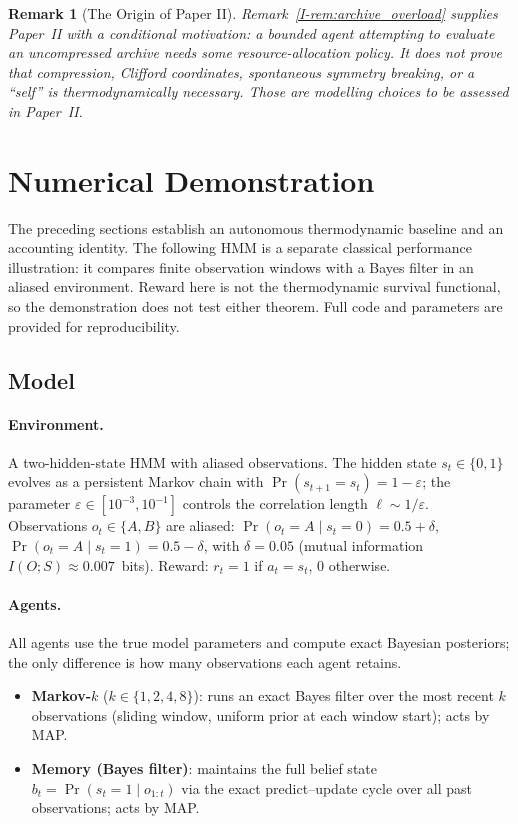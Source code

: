 \documentclass[12pt,a4paper,openany]{book}
\newtheorem{remark}[theorem]{Remark}
\begin{document}
\begin{remark}[The Origin of Paper II]
\label{I-rem:paper_II}
Remark~\ref{I-rem:archive_overload} supplies Paper~II with a conditional
motivation: a bounded agent attempting to evaluate an uncompressed
archive needs some resource-allocation policy.  It does not prove that
compression, Clifford coordinates, spontaneous symmetry breaking, or a
``self'' is thermodynamically necessary.  Those are modelling choices
to be assessed in Paper~II.
\end{remark}

\section{Numerical Demonstration}
\label{I-sec:numerical}

The preceding sections establish an autonomous thermodynamic baseline
and an accounting identity.  The following HMM is a separate classical
performance illustration: it compares finite observation windows with
a Bayes filter in an aliased environment.  Reward here is not the
thermodynamic survival functional, so the demonstration does not test
either theorem.
Full code and parameters are provided for reproducibility.

\subsection{Model}
\label{I-subsec:demo_model}

\paragraph{Environment.}
A two-hidden-state HMM with aliased observations.
The hidden state $s_t \in \{0,1\}$ evolves as a persistent
Markov chain with $\Pr(s_{t+1} = s_t) = 1 - \varepsilon$;
the parameter $\varepsilon \in [10^{-3}, 10^{-1}]$ controls
the correlation length $\ell \sim 1/\varepsilon$.
Observations $o_t \in \{A, B\}$ are aliased:
$\Pr(o_t = A \mid s_t = 0) = 0.5 + \delta$,
$\Pr(o_t = A \mid s_t = 1) = 0.5 - \delta$,
with $\delta = 0.05$ (mutual information
$I(O; S) \approx 0.007$~bits).
Reward: $r_t = 1$ if $a_t = s_t$, $0$ otherwise.

\paragraph{Agents.}
All agents use the true model parameters and compute
exact Bayesian posteriors; the only difference is how many
observations each agent retains.
\begin{itemize}
\item \textbf{Markov-$k$} ($k \in \{1,2,4,8\}$): runs
  an exact Bayes filter over the most recent $k$
  observations (sliding window, uniform prior at each
  window start); acts by MAP.
\item \textbf{Memory (Bayes filter)}: maintains the full
  belief state $b_t = \Pr(s_t = 1 \mid o_{1:t})$ via the
  exact predict--update cycle over all past observations;
  acts by MAP.
\end{itemize}
\end{document}
